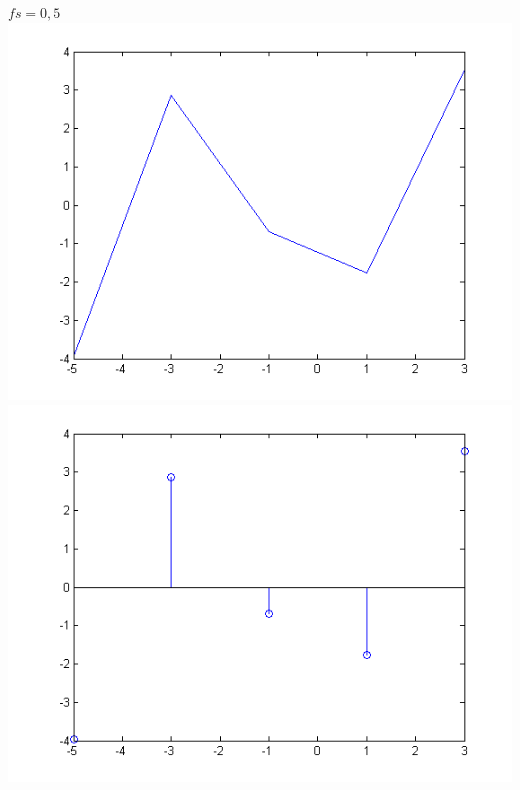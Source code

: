 \documentclass[a4paper,12pt]{article}
\begin{document}
\begin{enumerate}
\begin{center}
$fs = 0,5$
\includegraphics[width=.9 \textwidth]{../ejercicio-4-b-2.png}
\includegraphics[width=.9 \textwidth]{../ejercicio-4-b-1.png}
\end{center}


\end{enumerate}
\end{document}
